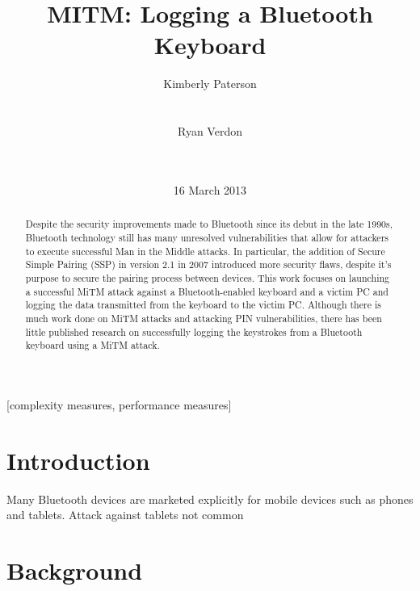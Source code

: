 \documentclass{acm_proc_article-sp}
\begin{document}
\title{MITM: Logging a Bluetooth Keyboard}

\author{
\alignauthor Kimberly Paterson\\
\\
\\
\alignauthor Ryan Verdon\\
\\
\\
}

\date{16 March 2013}
\maketitle

\begin{abstract}
Despite the security improvements made to Bluetooth since its debut in the late 1990s, Bluetooth technology still has many unresolved vulnerabilities that allow for attackers to execute successful Man in the Middle attacks. In particular, the addition of Secure Simple Pairing (SSP) in version 2.1 in 2007 introduced more security flaws, despite it's purpose to secure the pairing process between devices. This work focuses on launching a successful MiTM attack against a Bluetooth-enabled keyboard and a victim PC and logging the data transmitted from the keyboard to the victim PC. Although there is much work done on MiTM attacks and attacking PIN vulnerabilities, there has been little published research on successfully logging the keystrokes from a Bluetooth keyboard using a MiTM attack. 
\end{abstract}


[complexity measures, performance measures]


\section{Introduction}
Many Bluetooth devices are marketed explicitly for mobile devices such as phones and tablets. 
Attack against tablets not common

\section{Background}
\end{document}
